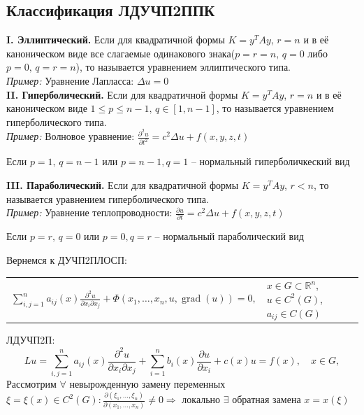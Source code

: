 \subsection{Классификация ЛДУЧП2ППК}
\textbf{I. Эллиптический.}
Если для квадратичной формы $K=y^T A y$, $r=n$ и в её каноническом виде все слагаемые одинакового знака($p=r=n,\,q=0$ либо $p=0,\,q=r=n$), то \LDUChPSPPK{} называется уравнением эллиптического типа.\smallskip\\
\emph{Пример:} Уравнение Лапласса: $\displaystyle \Delta u = 0$ \smallskip\\
\textbf{II. Гиперболический.}
Если для квадратичной формы $K = y^TAy$, $r=n$ и в её каноническом виде $1\le p \le n-1,\,q \in [1,n-1]$, то \LDUChPSPPK{} называется уравнением гиперболического типа.\medskip\\
\emph{Пример:} Волновое уравнение: $\displaystyle \frac{\partial^2 u}{\partial t^2} = c^2 \Delta u + f(x, y, z, t)$
\begin{note}
	Если $p=1,\,q=n-1$ или $p=n-1,q=1$ -- нормальный гиперболичкеский вид
\end{note}
\textbf{III. Параболический.}
Если для квадратичной формы $K = y^TAy$, $r<n$, то \LDUChPSPPK{} называется уравнением гиперболического типа.\medskip\\
\emph{Пример:} Уравнение теплопроводности: $\displaystyle \frac{\partial u}{\partial t} = c^2 \Delta u + f(x, y, z, t)$
\begin{note}
	Если $p=r,\,q=0$ или $p=0,q=r$ -- нормальный параболический вид
\end{note}
Вернемся к ДУЧП2ПЛОСП:\\
\begin{tabular}{p{} p{}}
	\hspace{1cm}\(\displaystyle
	\sum_{i,j=1}^{n} a_{ij}(x)\frac{\partial^2u}{\partial x_i \partial x_j} + \Phi(x_1, \ldots, x_n, u, \operatorname{grad}(u)) = 0,
	\) &
	$x \in G \subset \mathbb R^n$, $u \in C^2(G)$, $a_{ij} \in C(G)$
\end{tabular}\par\medskip
ЛДУЧП2П:%
$$
	Lu=\sum_{i,j=1}^{n} a_{ij}(x)\frac{\partial^2u}{\partial x_i \partial x_j} + \sum_{i=1}^{n} b_{i}(x)\frac{\partial u}{\partial x_i} + c(x)u = f(x), \quad x \in G,
$$
Рассмотрим $\forall$ невырожденную замену переменных $\displaystyle \xi=\xi(x)\in C^2(G) : \frac{\partial(\xi_1,\dots,\xi_n)}{\partial(x_1,\dots,x_n)}\ne0 \Longrightarrow$ локально $\exists$ обратная замена $x=x(\xi)$ \\

